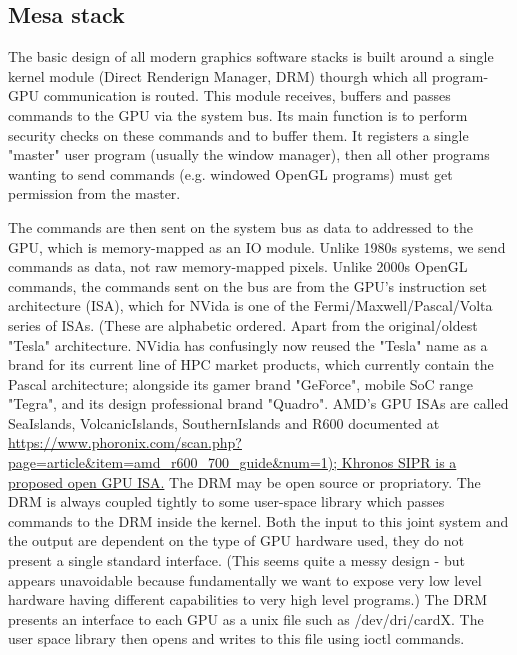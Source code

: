 \documentclass[oneside,english]{scrbook}
\begin{document}
\subsection{Mesa stack}

The basic design of all modern graphics software stacks is built around a single kernel module (Direct Renderign Manager, DRM) thourgh which all program-GPU communication is routed. This module receives, buffers and passes commands to the GPU via the system bus. Its main function is to perform security checks on these commands and to buffer them.  It registers a single "master" user program (usually the window manager), then all other programs wanting to send commands (e.g. windowed OpenGL programs) must get permission from the master.    

The commands are then sent on the system bus as data to addressed to the GPU, which is memory-mapped as an IO module.  Unlike 1980s systems, we send commands as data, not raw memory-mapped pixels.  Unlike 2000s OpenGL commands, the commands sent on the bus are from the GPU's instruction set architecture (ISA), which for NVida is one of the Fermi/Maxwell/Pascal/Volta series of ISAs. (These are alphabetic ordered. Apart from the original/oldest "Tesla" architecture. NVidia has confusingly now reused the "Tesla" name as a brand for its current line of HPC market products, which currently contain the Pascal architecture; alongside its gamer brand "GeForce", mobile SoC range "Tegra", and its design professional brand "Quadro".   AMD's GPU ISAs are called SeaIslands, VolcanicIslands, SouthernIslands and R600 documented at \url{https://www.phoronix.com/scan.php?page=article&item=amd_r600_700_guide&num=1); Khronos SIPR is a proposed open GPU ISA.} The DRM may be open source or propriatory.  The DRM is always coupled tightly to some user-space library which passes commands to the DRM inside the kernel.  Both the input to this joint system and the output are dependent on the type of GPU hardware used, they do not present a single standard interface. (This seems quite a messy design - but appears unavoidable because fundamentally we want to expose very low level hardware having different capabilities to very high level programs.)  The DRM presents an interface to each GPU as a unix file such as /dev/dri/cardX.  The user space library then opens and writes to this file using ioctl commands.
\end{document}
